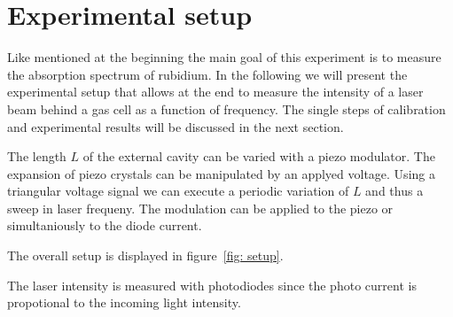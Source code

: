 \section{Experimental setup}
Like mentioned at the beginning the main goal of this experiment is to measure the absorption spectrum of rubidium.
In the following we will present the experimental setup that allows at the end to measure the intensity of a laser beam
behind a gas cell as a function of frequency. The single steps of calibration and experimental results will be discussed
in the next section.

The length $L$ of the external cavity can be varied with a piezo modulator. The expansion of piezo crystals can be manipulated by an
applyed voltage. Using a triangular voltage signal we can execute a periodic variation of $L$ and thus a sweep in laser frequeny. The
modulation can be applied to the piezo or simultaniously to the diode current.

The overall setup is displayed in figure~\ref{fig: setup}.


The laser intensity is measured with photodiodes since the photo current
is propotional to the incoming light intensity.
